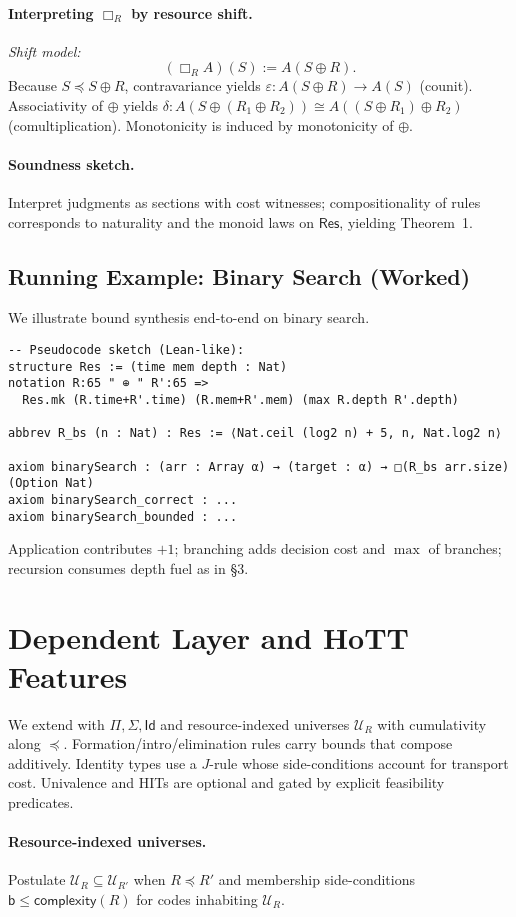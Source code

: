 \documentclass[11pt]{article}
\newcommand{\Res}{\mathsf{Res}}
\newcommand{\bb}{\mathsf{b}}
\newcommand{\Id}{\mathsf{Id}}
\newcommand{\UR}{\mathcal{U}}
\newcommand{\modal}[1]{\Box_{#1}}
\newcommand{\leqR}{\preceq}
\begin{document}
\paragraph{Interpreting $\modal{R}$ by resource shift.}
\emph{Shift model:}
\[
(\modal{R}A)(S) := A(S\oplus R).
\]
Because $S\leqR S\oplus R$, contravariance yields $\varepsilon: A(S\oplus R)\to A(S)$ (counit). Associativity of $\oplus$ yields $\delta: A(S\oplus(R_1\oplus R_2)) \cong A((S\oplus R_1)\oplus R_2)$ (comultiplication). Monotonicity is induced by monotonicity of $\oplus$.
\paragraph{Soundness sketch.} Interpret judgments as sections with cost witnesses; compositionality of rules corresponds to naturality and the monoid laws on $\Res$, yielding Theorem~1.

\subsection{Running Example: Binary Search (Worked)}
We illustrate bound synthesis end-to-end on binary search.
\begin{lstlisting}[language=lean]
-- Pseudocode sketch (Lean-like):
structure Res := (time mem depth : Nat)
notation R:65 " ⊕ " R':65 => 
  Res.mk (R.time+R'.time) (R.mem+R'.mem) (max R.depth R'.depth)

abbrev R_bs (n : Nat) : Res := ⟨Nat.ceil (log2 n) + 5, n, Nat.log2 n⟩

axiom binarySearch : (arr : Array α) → (target : α) → □(R_bs arr.size) (Option Nat)
axiom binarySearch_correct : ...
axiom binarySearch_bounded : ...
\end{lstlisting}
Application contributes $+1$; branching adds decision cost and $\max$ of branches; recursion consumes depth fuel as in \S3.

\section{Dependent Layer and HoTT Features}
\label{sec:dependent}
We extend with $\Pi,\Sigma,\Id$ and resource-indexed universes $\UR_R$ with cumulativity along $\leqR$. Formation/intro/elimination rules carry bounds that compose additively. Identity types use a $J$-rule whose side-conditions account for transport cost. Univalence and HITs are optional and gated by explicit feasibility predicates.
\paragraph{Resource-indexed universes.} Postulate $\UR_R\subseteq\UR_{R'}$ when $R\leqR R'$ and membership side-conditions $\bb\le \mathsf{complexity}(R)$ for codes inhabiting $\UR_R$.
\end{document}
